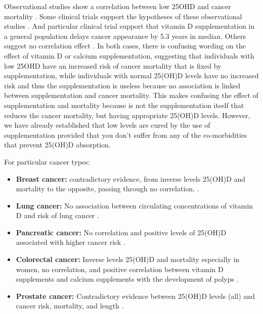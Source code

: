 Observational studies show a correlation between low 25OHD and cancer mortality \cite{ref:Yin2013, ref:Han2019, ref:Bouillon2021}. Some clinical trials support the hypotheses of these observational studies \cite{ref:Keum2014, ref:Bjelakovic2014, ref:Keum2019}. And particular clinical trial support that vitamin D supplementation in a general population delays cancer appearance by 5.3 years in median\cite{ref:Manson2019}. Others suggest no correlation effect \cite{ref:Bouillon2021, ref:Moyer2014}. In both cases, there is confusing wording on the effect of vitamin D or calcium supplementation, suggesting that individuals with low 25OHD have an increased risk of cancer mortality that is fixed by supplementation, while individuals with normal 25(OH)D levels have no increased risk and thus the supplementation is useless because no association is linked between supplementation and cancer mortality. This makes confusing the effect of supplementation and mortality because is not the supplementation itself that reduces the cancer mortality, but having appropriate 25(OH)D levels. However, we have already established that low levels are cured by the use of supplementation provided that you don't suffer from any of the co-morbidities that prevent 25(OH)D absorption.

For particular cancer types:

\begin{itemize}
    
    \item \textbf{Breast cancer:} contradictory evidence, from inverse levels 25(OH)D and mortality to the opposite, passing through no correlation. \cite{ref:Cauley2013, ref:Chlebowski2008, ref:WactawskiWende2006, ref:Yao2017, ref:Skaaby2014, ref:OBrien2017, ref:McNamara2019}.
    
    \item \textbf{Lung cancer:} No association between circulating concentrations of vitamin D and risk of lung cancer \cite{ref:Muller2018}.
    
    \item \textbf{Pancreatic cancer:} No correlation and positive levels of 25(OH)D associated with higher cancer risk \cite{ref:Helzlsouer2010, ref:StolzenbergSolomon2006, ref:vanDuijnhoven2017}.
    
    \item \textbf{Colorectal cancer:} Inverse levels 25(OH)D and mortality especially in women, no correlation, and positive correlation between vitamin D supplements and calcium supplements with the development of polyps \cite{ref:Cauley2013, ref:Song2021, ref:Crockett2018, ref:McCullough2018}.
    
    \item \textbf{Prostate cancer:} Contradictory evidence between 25(OH)D levels (all) and cancer risk, mortality, and length \cite{ref:Shahvazi2018, ref:Song2018, ref:NairShalliker2020, ref:Travis2019, ref:Jiang2018, ref:Heath2019, ref:Schenk2014, ref:Kristal2014, ref:Xu2014}.  
    
\end{itemize}



